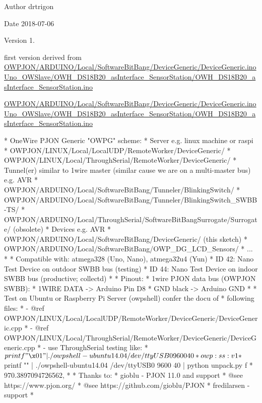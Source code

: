 \begin{DoxyAuthor}{Author}
drtrigon 
\end{DoxyAuthor}
\begin{DoxyDate}{Date}
2018-\/07-\/06 
\end{DoxyDate}
\begin{DoxyVersion}{Version}
1. \begin{DoxyItemize}
\item first version derived from \hyperlink{ARDUINO_2Local_2SoftwareBitBang_2DeviceGeneric_2DeviceGeneric_8ino}{O\-W\-P\-J\-O\-N/\-A\-R\-D\-U\-I\-N\-O/\-Local/\-Software\-Bit\-Bang/\-Device\-Generic/\-Device\-Generic.\-ino} \hyperlink{OWH__DS18B20__asInterface__SensorStation_8ino}{Uno\-\_\-\-O\-W\-Slave/\-O\-W\-H\-\_\-\-D\-S18\-B20\-\_\-as\-Interface\-\_\-\-Sensor\-Station/\-O\-W\-H\-\_\-\-D\-S18\-B20\-\_\-as\-Interface\-\_\-\-Sensor\-Station.\-ino}\end{DoxyItemize}
\hyperlink{ARDUINO_2Local_2SoftwareBitBang_2DeviceGeneric_2DeviceGeneric_8ino}{O\-W\-P\-J\-O\-N/\-A\-R\-D\-U\-I\-N\-O/\-Local/\-Software\-Bit\-Bang/\-Device\-Generic/\-Device\-Generic.\-ino} \hyperlink{OWH__DS18B20__asInterface__SensorStation_8ino}{Uno\-\_\-\-O\-W\-Slave/\-O\-W\-H\-\_\-\-D\-S18\-B20\-\_\-as\-Interface\-\_\-\-Sensor\-Station/\-O\-W\-H\-\_\-\-D\-S18\-B20\-\_\-as\-Interface\-\_\-\-Sensor\-Station.\-ino}
\end{DoxyVersion}
\begin{DoxyVerb}* OneWire PJON Generic "OWPG" scheme:
*   Server e.g. linux machine or raspi
*      OWPJON/LINUX/Local/LocalUDP/RemoteWorker/DeviceGeneric/
*      OWPJON/LINUX/Local/ThroughSerial/RemoteWorker/DeviceGeneric/
*   Tunnel(er) similar to 1wire master (similar cause we are on a multi-master bus) e.g. AVR
*      OWPJON/ARDUINO/Local/SoftwareBitBang/Tunneler/BlinkingSwitch/
*      OWPJON/ARDUINO/Local/SoftwareBitBang/Tunneler/BlinkingSwitch_SWBB-TS/
*      OWPJON/ARDUINO/Local/ThroughSerial/SoftwareBitBangSurrogate/Surrogate/ (obsolete)
*   Devices e.g. AVR
*      OWPJON/ARDUINO/Local/SoftwareBitBang/DeviceGeneric/ (this sketch)
*      OWPJON/ARDUINO/Local/SoftwareBitBang/OWP_DG_LCD_Sensors/
*      ...
*
* Compatible with: atmega328 (Uno, Nano), atmega32u4 (Yun)
*   ID 42: Nano Test Device on outdoor SWBB bus (testing)
*   ID 44: Nano Test Device on indoor SWBB bus (productive; collectd)
*
* Pinout:
*   1wire PJON data bus (OWPJON SWBB):
*        1WIRE DATA    -> Arduino Pin D8
*        GND black     -> Arduino GND
*
* Test on Ubuntu or Raspberry Pi Server (owpshell) confer the docu of
* following files:
*   - @ref OWPJON/LINUX/Local/LocalUDP/RemoteWorker/DeviceGeneric/DeviceGeneric.cpp
*   - @ref OWPJON/LINUX/Local/ThroughSerial/RemoteWorker/DeviceGeneric/DeviceGeneric.cpp
*   - use ThroughSerial testing like:
*     $ printf "\x01" | ./owpshell-ubuntu14.04 /dev/ttyUSB0 9600 40
*     owp:ss:v1
*     $ printf "" | ./owpshell-ubuntu14.04 /dev/ttyUSB0 9600 40 | python unpack.py f
*     970.3897094726562,
*
* Thanks to:
* gioblu - PJON 11.0 and support
*          @see https://www.pjon.org/
*          @see https://github.com/gioblu/PJON
* fredilarsen - support
* \end{DoxyVerb}
 

